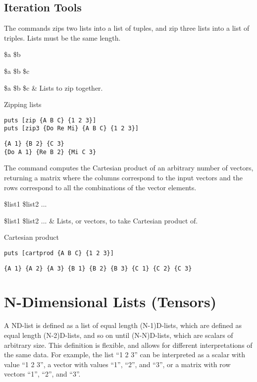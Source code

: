 \documentclass{article}
\begin{document}
\subsection{Iteration Tools}
The commands  zips two lists into a list of tuples, and  zip three lists into a list of triples.
Lists must be the same length.
\begin{syntax}
 \$a \$b
\end{syntax}
\begin{syntax}
 \$a \$b \$c
\end{syntax}
\begin{args}
\$a \$b \$c & Lists to zip together.
\end{args}
\begin{example}{Zipping lists}
\begin{lstlisting}
puts [zip {A B C} {1 2 3}]
puts [zip3 {Do Re Mi} {A B C} {1 2 3}]
\end{lstlisting}
\tcblower
\begin{lstlisting}
{A 1} {B 2} {C 3}
{Do A 1} {Re B 2} {Mi C 3}
\end{lstlisting}
\end{example}
The command  computes the Cartesian product of an arbitrary number of vectors, returning a matrix where the columns correspond to the input vectors and the rows correspond to all the combinations of the vector elements.
\begin{syntax}
 \$list1 \$list2 ...
\end{syntax}
\begin{args}
\$list1 \$list2 ... & Lists, or vectors, to take Cartesian product of.
\end{args}

\begin{example}{Cartesian product}
\begin{lstlisting}
puts [cartprod {A B C} {1 2 3}]
\end{lstlisting}
\tcblower
\begin{lstlisting}
{A 1} {A 2} {A 3} {B 1} {B 2} {B 3} {C 1} {C 2} {C 3}
\end{lstlisting}
\end{example}

\clearpage
\section{N-Dimensional Lists (Tensors)}
A ND-list is defined as a list of equal length (N-1)D-lists, which are defined as equal length (N-2)D-lists, and so on until (N-N)D-lists, which are scalars of arbitrary size.
This definition is flexible, and allows for different interpretations of the same data. 
For example, the list ``1 2 3'' can be interpreted as a scalar with value ``1 2 3'', a vector with values ``1'', ``2'', and ``3'', or a matrix with row vectors ``1'', ``2'', and ``3''. 
\end{document}
